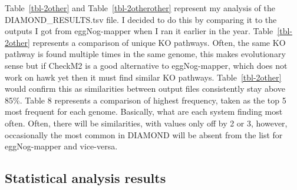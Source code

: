\documentclass[
  letterpaper,
  DIV=11,
  numbers=noendperiod]{scrreprt}
\begin{document}
Table~\ref{tbl-2other} and Table~\ref{tbl-2otherother} represent my
analysis of the DIAMOND\_RESULTS.tsv file. I decided to do this by
comparing it to the outputs I got from eggNog-mapper when I ran it
earlier in the year. Table~\ref{tbl-2other} represents a comparison of
unique KO pathways. Often, the same KO pathway is found multiple times
in the same genome, this makes evolutionary sense but if CheckM2 is a
good alternative to eggNog-mapper, which does not work on hawk yet then
it must find similar KO pathways. Table~\ref{tbl-2other} would confirm
this as similarities between output files consistently stay above 85\%.
Table 8 represents a comparison of highest frequency, taken as the top 5
most frequent for each genome. Basically, what are each system finding
most often. Often, there will be similarities, with values only off by 2
or 3, however, occasionally the most common in DIAMOND will be absent
from the list for eggNog-mapper and vice-versa.

\subsection{Statistical analysis
results}\label{statistical-analysis-results}

\begin{table}

\caption{\label{tbl-finaldiamond}Shared KO values between two systems
represented as proportions of their totals based on samples taken from
the skin microbiome of \emph{Dendrobates tinctorius}}


\end{table}%
\end{document}
